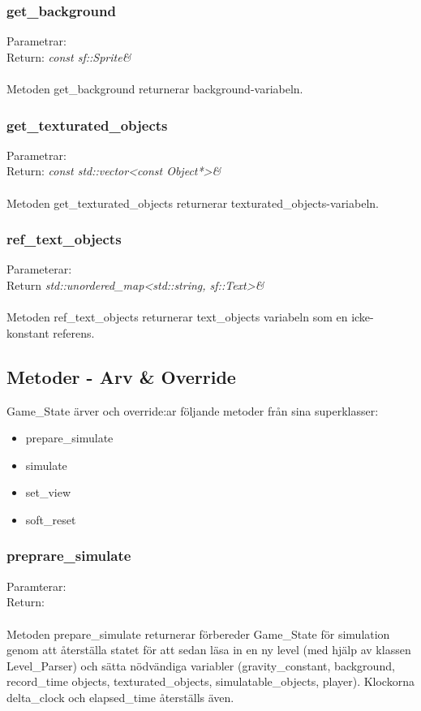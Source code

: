 \documentclass{TDP003mall}
\begin{document}
\subsubsection{get\_background}
Parametrar: \textit{}
\\Return: \textit{const sf::Sprite\&}
\\\\
Metoden get\_background returnerar background-variabeln.

\subsubsection{get\_texturated\_objects}
Parametrar: \textit{}
\\Return: \textit{const std::vector<const Object*>\&}
\\\\
Metoden get\_texturated\_objects returnerar texturated\_objects-variabeln.

\subsubsection{ref\_text\_objects}
Parameterar: \textit{}
\\Return \textit{std::unordered\_map<std::string, sf::Text>&}
\\\\
Metoden ref\_text\_objects returnerar text\_objects variabeln som en icke-konstant referens.

\subsection{Metoder - Arv \& Override}
Game\_State ärver och override:ar följande metoder från sina superklasser:
\begin{itemize}
\item prepare\_simulate
\item simulate
\item set\_view
\item soft\_reset
\end{itemize}

\subsubsection{preprare\_simulate}
Paramterar: \textit{}
\\Return: \textit{}
\\\\
Metoden prepare\_simulate returnerar förbereder Game\_State för simulation genom att återställa statet för att sedan läsa in en ny level (med hjälp av klassen Level\_Parser) och sätta nödvändiga variabler (gravity\_constant, background, record\_time objects, texturated\_objects, simulatable\_objects, player). Klockorna delta\_clock och elapsed\_time återställs även.
\\\\
\end{document}

